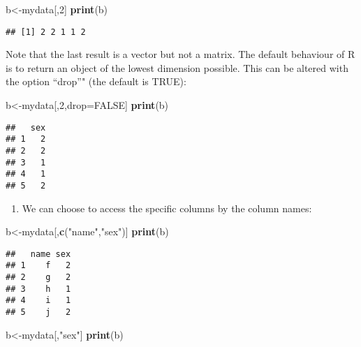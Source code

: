 \documentclass[]{book}
\newenvironment{Shaded}{\begin{snugshade}}{\end{snugshade}}
\newcommand{\KeywordTok}[1]{\textcolor[rgb]{0.13,0.29,0.53}{\textbf{#1}}}
\newcommand{\DecValTok}[1]{\textcolor[rgb]{0.00,0.00,0.81}{#1}}
\newcommand{\StringTok}[1]{\textcolor[rgb]{0.31,0.60,0.02}{#1}}
\newcommand{\OtherTok}[1]{\textcolor[rgb]{0.56,0.35,0.01}{#1}}
\newcommand{\NormalTok}[1]{#1}
\providecommand{\tightlist}{%
  \setlength{\itemsep}{0pt}\setlength{\parskip}{0pt}}
\theoremstyle{definition}
\theoremstyle{definition}
\theoremstyle{definition}
\theoremstyle{remark}
\begin{document}
\begin{Shaded}
\begin{Highlighting}[]
\NormalTok{b<-mydata[,}\DecValTok{2}\NormalTok{]}
\KeywordTok{print}\NormalTok{(b)}
\end{Highlighting}
\end{Shaded}

\begin{verbatim}
## [1] 2 2 1 1 2
\end{verbatim}

Note that the last result is a vector but not a matrix. The default
behaviour of R is to return an object of the lowest dimension possible.
This can be altered with the option ``drop''" (the default is TRUE):

\begin{Shaded}
\begin{Highlighting}[]
\NormalTok{b<-mydata[,}\DecValTok{2}\NormalTok{,drop=}\OtherTok{FALSE}\NormalTok{]}
\KeywordTok{print}\NormalTok{(b)}
\end{Highlighting}
\end{Shaded}

\begin{verbatim}
##   sex
## 1   2
## 2   2
## 3   1
## 4   1
## 5   2
\end{verbatim}

\begin{enumerate}
\def\labelenumi{(\arabic{enumi})}
\setcounter{enumi}{1}
\tightlist
\item
  We can choose to access the specific columns by the column names:
\end{enumerate}

\begin{Shaded}
\begin{Highlighting}[]
\NormalTok{b<-mydata[,}\KeywordTok{c}\NormalTok{(}\StringTok{"name"}\NormalTok{,}\StringTok{"sex"}\NormalTok{)]}
\KeywordTok{print}\NormalTok{(b)}
\end{Highlighting}
\end{Shaded}

\begin{verbatim}
##   name sex
## 1    f   2
## 2    g   2
## 3    h   1
## 4    i   1
## 5    j   2
\end{verbatim}

\begin{Shaded}
\begin{Highlighting}[]
\NormalTok{b<-mydata[,}\StringTok{"sex"}\NormalTok{]}
\KeywordTok{print}\NormalTok{(b)}
\end{Highlighting}
\end{Shaded}
\end{document}
